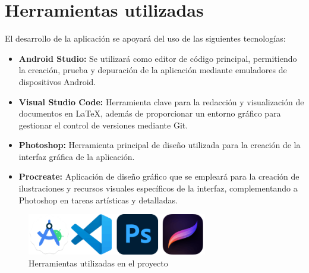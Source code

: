 \section{Herramientas utilizadas}

El desarrollo de la aplicación se apoyará del uso de las siguientes tecnologías:

\begin{itemize}
    \item \textbf{Android Studio:} Se utilizará como editor de código principal, permitiendo la creación, prueba y depuración de la aplicación mediante emuladores de dispositivos Android.
    \item \textbf{Visual Studio Code:} Herramienta clave para la redacción y visualización de documentos en LaTeX, además de proporcionar un entorno gráfico para gestionar el control de versiones mediante Git.
    \item \textbf{Photoshop:} Herramienta principal de diseño utilizada para la creación de la interfaz gráfica de la aplicación.
    \item \textbf{Procreate:} Aplicación de diseño gráfico que se empleará para la creación de ilustraciones y recursos visuales específicos de la interfaz, complementando a Photoshop en tareas artísticas y detalladas.
\end{itemize}

\begin{figure}[H]
    \centering
    \includegraphics[width=0.7\textwidth]{include/images/herramientas.png}
    \caption{Herramientas utilizadas en el proyecto}
    \label{figure:tools}
\end{figure}
	
\cleardoublepage